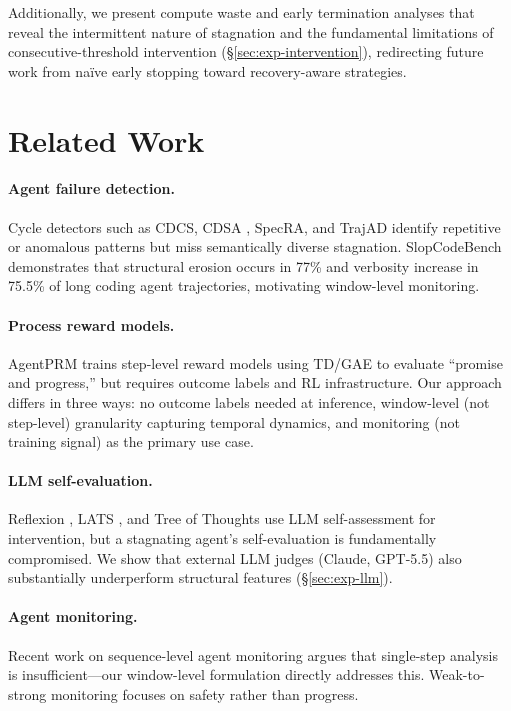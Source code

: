 \documentclass[11pt,a4paper]{article}
\begin{document}
Additionally, we present compute waste and early termination analyses that reveal the intermittent nature of stagnation and the fundamental limitations of consecutive-threshold intervention (\S\ref{sec:exp-intervention}), redirecting future work from na\"ive early stopping toward recovery-aware strategies.

\section{Related Work}
\label{sec:related}

\paragraph{Agent failure detection.}
Cycle detectors such as CDCS, CDSA \cite{zhang2024cdcs}, SpecRA, and TrajAD identify repetitive or anomalous patterns but miss semantically diverse stagnation.
SlopCodeBench \cite{slopcodebench2026} demonstrates that structural erosion occurs in 77\% and verbosity increase in 75.5\% of long coding agent trajectories, motivating window-level monitoring.

\paragraph{Process reward models.}
AgentPRM \cite{xi2026agentprm} trains step-level reward models using TD/GAE to evaluate ``promise and progress,'' but requires outcome labels and RL infrastructure.
Our approach differs in three ways: no outcome labels needed at inference, window-level (not step-level) granularity capturing temporal dynamics, and monitoring (not training signal) as the primary use case.

\paragraph{LLM self-evaluation.}
Reflexion \cite{shinn2023reflexion}, LATS \cite{zhou2024lats}, and Tree of Thoughts \cite{yao2024tree} use LLM self-assessment for intervention, but a stagnating agent's self-evaluation is fundamentally compromised.
We show that external LLM judges (Claude, GPT-5.5) also substantially underperform structural features (\S\ref{sec:exp-llm}).

\paragraph{Agent monitoring.}
Recent work on sequence-level agent monitoring \cite{iclr2025monitoring} argues that single-step analysis is insufficient---our window-level formulation directly addresses this.
Weak-to-strong monitoring \cite{reliable2025} focuses on safety rather than progress.
\end{document}
